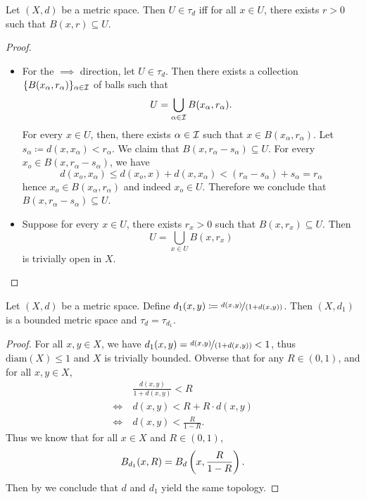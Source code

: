 \documentclass[screen]{techreport}
\numberwithin{equation}{section}
\begin{document}
\begin{proposition}\label{Prop:MetricOpenFindABall}
	Let $(X,d)$ be a metric space. Then $U \in \tau_d$ iff for all $x \in U$, there exists $r >0$ such that $B(x,r) \subseteq U$.
\end{proposition}
\begin{proof}\
	\begin{itemize}
		\item For the ${\implies}$ direction, let $U \in \tau_d$.
		Then there exists a collection $\{B(x_\alpha,r_\alpha)\}_{\alpha \in \mathcal{I}}$ of balls such that
		\[
		U = \bigcup_{\alpha \in \mathcal{I}} B(x_\alpha,r_\alpha).
		\]
		For every $x \in U$, then, there exists $\alpha \in \mathcal{I}$ such that $x \in B(x_\alpha,r_\alpha)$.
		Let $s_\alpha \coloneqq d(x,x_\alpha) < r_\alpha$.
		We claim that $B(x,r_\alpha-s_\alpha) \subseteq U$.
		For every $x_o \in B(x,r_\alpha-s_\alpha)$, we have
		\[
		d(x_o,x_\alpha) \le d(x_o,x) + d(x,x_\alpha) < (r_\alpha - s_\alpha) + s_\alpha = r_\alpha
		\]
		hence $x_o \in B(x_\alpha,r_\alpha)$ and indeed $x_o \in U$.
		Therefore we conclude that $B(x,r_\alpha-s_\alpha) \subseteq U$.
		
		\item Suppose for every $x \in U$, there exists $r_x > 0$ such that $B(x,r_x) \subseteq U$.
		Then
		\[
		U = \bigcup_{x \in U} B(x,r_x)
		\]
		is trivially open in $X$.
	\end{itemize}
\end{proof}

\begin{proposition}\label{Prop:MetricCanAlwaysBounded}
	Let $(X,d)$ be a metric space.
	Define $d_1(x,y) \coloneqq \nicefrac{d(x,y)}{(1 + d(x,y))}$.
	Then $(X,d_1)$ is a bounded metric space and $\tau_d = \tau_{d_1}$.
\end{proposition}
\begin{proof}
	For all $x,y \in X$, we have $d_1(x,y) = \nicefrac{d(x,y)}{(1+d(x,y))} < 1$, thus $\mathrm{diam}(X) \le 1$ and $X$ is trivially bounded.
	Obverse that for any $R \in (0,1)$, and for all $x, y \in X$,
	\begin{align}
		& \frac{d(x,y)}{1+d(x,y)} < R \\
		\iff~ & d(x,y) < R + R \cdot d(x,y) \\
		\iff~ & d(x,y) < \frac{R}{1-R}.
	\end{align}
	Thus we know that for all $x \in X$ and $R \in (0,1)$,
	\[
	B_{d_1}(x,R) = B_d\left({x, \frac{R}{1-R} }\right).
	\]
	Then by  we conclude that $d$ and $d_1$ yield the same topology.
\end{proof}
\end{document}
